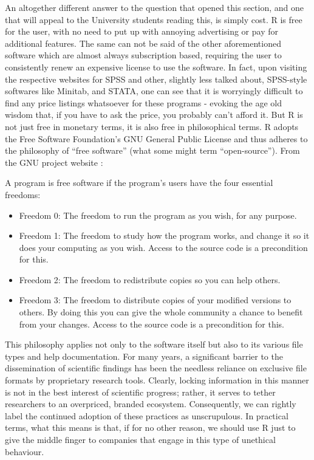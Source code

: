 
An altogether different answer to the question that opened this section, and one that will appeal to the University students reading this, is simply cost. R is free for the user, with no need to put up with annoying advertising or pay for additional features. The same can not be said of the other aforementioned software which are almost always subscription based, requiring the user to consistently renew an expensive license to use the software. In fact, upon visiting the respective websites for SPSS and other, slightly less talked about, SPSS-style softwares like Minitab, and STATA, one can see that it is worryingly difficult to find any price listings whatsoever for these programs - evoking the age old wisdom that, if you have to ask the price, you probably can't afford it.  But R is not just free in monetary terms, it is also free in philosophical terms. R adopts the Free Software Foundation’s GNU General Public License and thus adheres to the philosophy of ``free software'' (what some might term ``open-source'').  From the GNU project website \parencite{GNUphil}:

{
\begin{displayquote}
\headingfont
A program is free software if the program's users have the four essential freedoms:

\begin{itemize}
\item Freedom 0: The freedom to run the program as you wish, for any purpose.
\item Freedom 1: The freedom to study how the program works, and change it so it does your computing as you wish. Access to the source code is a precondition for this.
\item Freedom 2: The freedom to redistribute copies so you can help others.
\item Freedom 3: The freedom to distribute copies of your modified versions to others. By doing this you can give the whole community a chance to benefit from your changes. Access to the source code is a precondition for this.
\end{itemize}
\end{displayquote}
}

This philosophy applies not only to the software itself but also to its various file types and help documentation. For many years, a significant barrier to the dissemination of scientific findings has been the needless reliance on exclusive file formats by proprietary research tools. Clearly, locking information in this manner is not in the best interest of scientific progress; rather, it serves to tether researchers to an overpriced, branded ecosystem. Consequently, we can rightly label the continued adoption of these practices as unscrupulous. In practical terms, what this means is that, if for no other reason, we should use R just to give the middle finger to companies that engage in this type of unethical behaviour.

